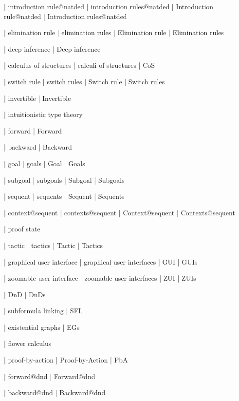  | introduction rule@natded
 | introduction rules@natded
 | Introduction rule@natded
 | Introduction rules@natded

 | elimination rule
 | elimination rules
 | Elimination rule
 | Elimination rules

 | deep inference
 | Deep inference

 | calculus of structures
 | calculi of structures
 | CoS
 
 | switch rule
 | switch rules
 | Switch rule
 | Switch rules

 | invertible
 | Invertible

 | intuitionistic type theory

 | forward
 | Forward

 | backward
 | Backward
 
 | goal
 | goals
 | Goal
 | Goals

 | subgoal
 | subgoals
 | Subgoal
 | Subgoals

 | sequent
 | sequents
 | Sequent
 | Sequents

 | context@sequent
 | contexts@sequent
 | Context@sequent
 | Contexts@sequent

 | proof state

 | tactic
 | tactics
 | Tactic
 | Tactics

 | graphical user interface
 | graphical user interfaces
 | GUI
 | GUIs

 | zoomable user interface
 | zoomable user interfaces
 | ZUI
 | ZUIs

 | DnD
 | DnDs

 | subformula linking
 | SFL

 | existential graphs
 | EGs

 | flower calculus


 | proof-by-action
 | Proof-by-Action
 | PbA

 | forward@dnd
 | Forward@dnd

 | backward@dnd
 | Backward@dnd

